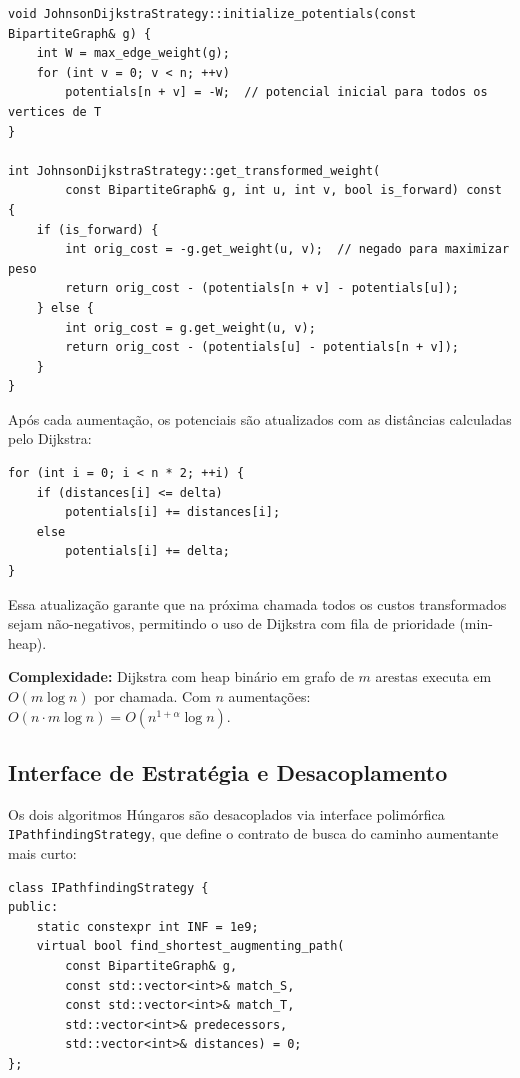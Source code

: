 \documentclass{infufrgs}
\begin{document}
\begin{lstlisting}[caption={Inicialização dos potenciais e transformação de pesos (JohnsonDijkstraStrategy.cpp)}]
void JohnsonDijkstraStrategy::initialize_potentials(const BipartiteGraph& g) {
    int W = max_edge_weight(g);
    for (int v = 0; v < n; ++v)
        potentials[n + v] = -W;  // potencial inicial para todos os vertices de T
}

int JohnsonDijkstraStrategy::get_transformed_weight(
        const BipartiteGraph& g, int u, int v, bool is_forward) const {
    if (is_forward) {
        int orig_cost = -g.get_weight(u, v);  // negado para maximizar peso
        return orig_cost - (potentials[n + v] - potentials[u]);
    } else {
        int orig_cost = g.get_weight(u, v);
        return orig_cost - (potentials[u] - potentials[n + v]);
    }
}
\end{lstlisting}

Após cada aumentação, os potenciais são atualizados com as distâncias calculadas pelo Dijkstra:

\begin{lstlisting}[caption={Atualização dos potenciais após cada Dijkstra (JohnsonDijkstraStrategy.cpp)}]
for (int i = 0; i < n * 2; ++i) {
    if (distances[i] <= delta)
        potentials[i] += distances[i];
    else
        potentials[i] += delta;
}
\end{lstlisting}

Essa atualização garante que na próxima chamada todos os custos transformados sejam não-negativos, permitindo o uso de Dijkstra com fila de prioridade (min-heap).

\textbf{Complexidade:} Dijkstra com heap binário em grafo de $m$ arestas executa em $O(m \log n)$ por chamada. Com $n$ aumentações: $O(n \cdot m \log n) = O(n^{1+\alpha} \log n)$.

\subsection{Interface de Estratégia e Desacoplamento}

Os dois algoritmos Húngaros são desacoplados via interface polimórfica \texttt{IPathfindingStrategy}, que define o contrato de busca do caminho aumentante mais curto:

\begin{lstlisting}[caption={Interface IPathfindingStrategy (IPathfindingStrategy.h)}]
class IPathfindingStrategy {
public:
    static constexpr int INF = 1e9;
    virtual bool find_shortest_augmenting_path(
        const BipartiteGraph& g,
        const std::vector<int>& match_S,
        const std::vector<int>& match_T,
        std::vector<int>& predecessors,
        std::vector<int>& distances) = 0;
};
\end{lstlisting}
\end{document}
